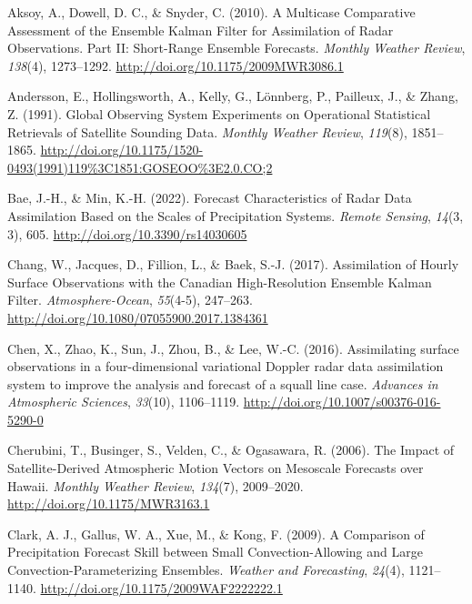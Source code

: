 \documentclass[12pt,twoside]{reedthesis}
\begin{document}
\setlength{\parindent}{-0.20in}

\hypertarget{refs}{}
\leavevmode\hypertarget{ref-aksoy2010}{}%
Aksoy, A., Dowell, D. C., \& Snyder, C. (2010). A Multicase Comparative Assessment of the Ensemble Kalman Filter for Assimilation of Radar Observations. Part II: Short-Range Ensemble Forecasts. \emph{Monthly Weather Review}, \emph{138}(4), 1273--1292. \url{http://doi.org/10.1175/2009MWR3086.1}

\leavevmode\hypertarget{ref-andersson1991}{}%
Andersson, E., Hollingsworth, A., Kelly, G., Lönnberg, P., Pailleux, J., \& Zhang, Z. (1991). Global Observing System Experiments on Operational Statistical Retrievals of Satellite Sounding Data. \emph{Monthly Weather Review}, \emph{119}(8), 1851--1865. \url{http://doi.org/10.1175/1520-0493(1991)119\%3C1851:GOSEOO\%3E2.0.CO;2}

\leavevmode\hypertarget{ref-bae2022}{}%
Bae, J.-H., \& Min, K.-H. (2022). Forecast Characteristics of Radar Data Assimilation Based on the Scales of Precipitation Systems. \emph{Remote Sensing}, \emph{14}(3, 3), 605. \url{http://doi.org/10.3390/rs14030605}

\leavevmode\hypertarget{ref-chang2017}{}%
Chang, W., Jacques, D., Fillion, L., \& Baek, S.-J. (2017). Assimilation of Hourly Surface Observations with the Canadian High-Resolution Ensemble Kalman Filter. \emph{Atmosphere-Ocean}, \emph{55}(4-5), 247--263. \url{http://doi.org/10.1080/07055900.2017.1384361}

\leavevmode\hypertarget{ref-chen2016}{}%
Chen, X., Zhao, K., Sun, J., Zhou, B., \& Lee, W.-C. (2016). Assimilating surface observations in a four-dimensional variational Doppler radar data assimilation system to improve the analysis and forecast of a squall line case. \emph{Advances in Atmospheric Sciences}, \emph{33}(10), 1106--1119. \url{http://doi.org/10.1007/s00376-016-5290-0}

\leavevmode\hypertarget{ref-cherubini2006}{}%
Cherubini, T., Businger, S., Velden, C., \& Ogasawara, R. (2006). The Impact of Satellite-Derived Atmospheric Motion Vectors on Mesoscale Forecasts over Hawaii. \emph{Monthly Weather Review}, \emph{134}(7), 2009--2020. \url{http://doi.org/10.1175/MWR3163.1}

\leavevmode\hypertarget{ref-clark2009}{}%
Clark, A. J., Gallus, W. A., Xue, M., \& Kong, F. (2009). A Comparison of Precipitation Forecast Skill between Small Convection-Allowing and Large Convection-Parameterizing Ensembles. \emph{Weather and Forecasting}, \emph{24}(4), 1121--1140. \url{http://doi.org/10.1175/2009WAF2222222.1}
\end{document}
